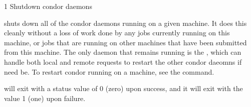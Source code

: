 \begin{ManPage}{\label{man-condor-off}}{1}
{Shutdown condor daemons}
\Synopsis {}



\Description 

 shuts down all of the condor daemons running on a given
machine.  It does this cleanly without a loss of work done by any jobs
currently running on this machine, or jobs that are running on other machines
that have been submitted from this machine.  The only daemon that remains
running is the , which can handle both local and remote
requests to restart the other condor daeomns if need be.  To restart
condor running on a machine, see the  command.

\begin{Options}
	\ToolArgsDesc
\end{Options}

\ExitStatus

 will exit with a status value of 0 (zero) upon success,
and it will exit with the value 1 (one) upon failure.

\end{ManPage}
